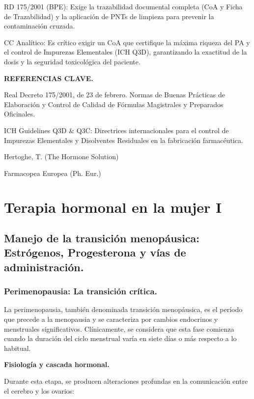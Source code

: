 \documentclass[
  spanish,
]{article}
\begin{document}
RD 175/2001 (BPE): Exige la trazabilidad documental completa (CoA y Ficha de Trazabilidad) y la aplicación de PNTs de limpieza para prevenir la contaminación cruzada.

CC Analítico: Es crítico exigir un CoA que certifique la máxima riqueza del PA y el control de Impurezas Elementales (ICH Q3D), garantizando la exactitud de la dosis y la seguridad toxicológica del paciente.

\textbf{REFERENCIAS CLAVE.}

Real Decreto 175/2001, de 23 de febrero. Normas de Buenas Prácticas de Elaboración y Control de Calidad de Fórmulas Magistrales y Preparados Oficinales.

ICH Guidelines Q3D \& Q3C: Directrices internacionales para el control de Impurezas Elementales y Disolventes Residuales en la fabricación farmacéutica.

Hertoghe, T. (The Hormone Solution)

Farmacopea Europea (Ph. Eur.)

\section{Terapia hormonal en la mujer I}\label{terapia-hormonal-1}

\subsection{Manejo de la transición menopáusica: Estrógenos, Progesterona y vías de administración.}\label{manejo-de-la-transiciuxf3n-menopuxe1usica-estruxf3genos-progesterona-y-vuxedas-de-administraciuxf3n.}

\subsubsection{Perimenopausia: La transición crítica.}\label{perimenopausia-la-transiciuxf3n-cruxedtica.}

La perimenopausia, también denominada transición menopáusica, es el período que precede a la menopausia y se caracteriza por cambios endocrinos y menstruales significativos. Clínicamente, se considera que esta fase comienza cuando la duración del ciclo menstrual varía en siete días o más respecto a lo habitual.

\textbf{Fisiología y cascada hormonal.}

Durante esta etapa, se producen alteraciones profundas en la comunicación entre el cerebro y los ovarios:
\end{document}
